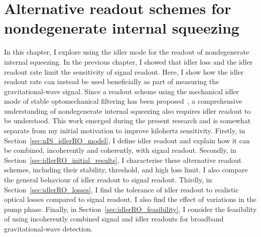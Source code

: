 \chapter{Alternative readout schemes for nondegenerate internal squeezing}
\label{chp:idler_readout}

In this chapter, I explore using the idler mode for the readout of nondegenerate internal squeezing. In the previous chapter, I showed that idler loss and the idler readout rate limit the sensitivity of signal readout. Here, I show how the idler readout rate can instead be used beneficially as part of measuring the gravitational-wave signal.
Since a readout scheme using the mechanical idler mode of stable optomechanical filtering has been proposed~\cite{liEnhancingInterferometerSensitivity2021}, a comprehensive understanding of nondegenerate internal squeezing also requires idler readout to be understood. This work emerged during the present research and is somewhat separate from my initial motivation to improve kilohertz sensitivity. %
Firstly, in Section~\ref{sec:nIS_idlerRO_model}, I define idler readout and explain how it can be combined, incoherently and coherently, with signal readout. %
Secondly, in Section~\ref{sec:idlerRO_initial_results}, I characterise these alternative readout schemes, including their stability, threshold, and high loss limit. I also compare the general behaviour of idler readout to signal readout. %
Thirdly, in Section~\ref{sec:idlerRO_losses}, I find the tolerance of idler readout to realistic optical losses compared to signal readout. %
I also find the effect of variations in the pump phase.  
Finally, in Section~\ref{sec:idlerRO_feasibility}, I consider the feasibility of using incoherently combined signal and idler readouts for broadband gravitational-wave detection. %


